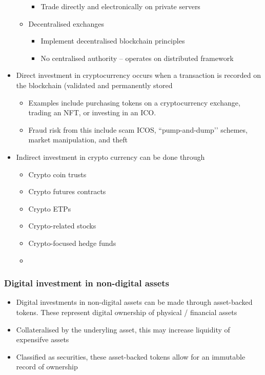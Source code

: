 \documentclass[../notes_compiled.tex]{subfiles}
\begin{document}
\begin{itemize}
\begin{itemize}
\begin{itemize}
\item Trade directly and electronically on private servers
\end{itemize}
\item Decentralised exchanges
\begin{itemize}
\item Implement decentralised blockchain principles
\item No centralised authority -- operates on distributed framework
\end{itemize}
\end{itemize}
\item Direct investment in cryptocurrency occurs when a transaction is recorded on the blockchain (validated and permanently stored
\begin{itemize}
\item Examples include purchasing tokens on a cryptocurrency exchange, trading an NFT, or investing in an ICO. 
\item Fraud risk from this include scam ICOS, ``pump-and-dump’’ schemes, market manipulation, and theft
\end{itemize}
\item Indirect investment in crypto currency can be done through
\begin{multicols}{2}
\begin{itemize}
\item Crypto coin trusts
\item Crypto futures contracts
\item Crypto ETPs
\item Crypto-related stocks
\item Crypto-focused hedge funds
\item []
\end{itemize}
\end{multicols}
\end{itemize}

\subsubsection{Digital investment in non-digital assets}
\begin{itemize}
\item Digital investments in non-digital assets can be made through asset-backed tokens. These represent digital ownership of physical / financial assets
\item Collateralised by the underyling asset, this may increase liquidity of expensifve assets
\item Classified as securities, these asset-backed tokens allow for an immutable record of ownership
\end{itemize}
\end{document}

